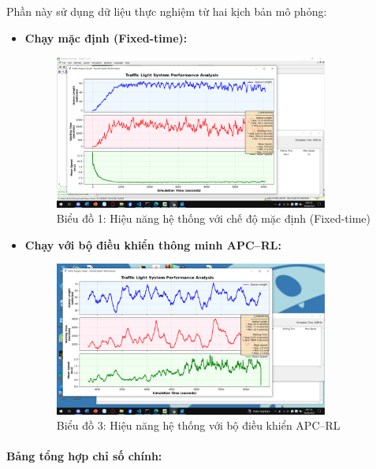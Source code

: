 Phần này sử dụng dữ liệu thực nghiệm từ hai kịch bản mô phỏng:
\begin{itemize}
    \item \textbf{Chạy mặc định (Fixed-time):}
    
    \begin{figure}[H]
        \centering
        \includegraphics[width=0.85\textwidth]{Screenshot (762).png}
        \caption{Biểu đồ 1: Hiệu năng hệ thống với chế độ mặc định (Fixed-time)}
        \label{fig:fixed_time_chart}
    \end{figure}

    \item \textbf{Chạy với bộ điều khiển thông minh APC–RL:}
    
    \begin{figure}[H]
        \centering
        \includegraphics[width=0.85\textwidth]{Screenshot (761).png}
        \caption{Biểu đồ 3: Hiệu năng hệ thống với bộ điều khiển APC–RL}
        \label{fig:apc_rl_chart}
    \end{figure}
\end{itemize}

\paragraph{Bảng tổng hợp chỉ số chính:}

